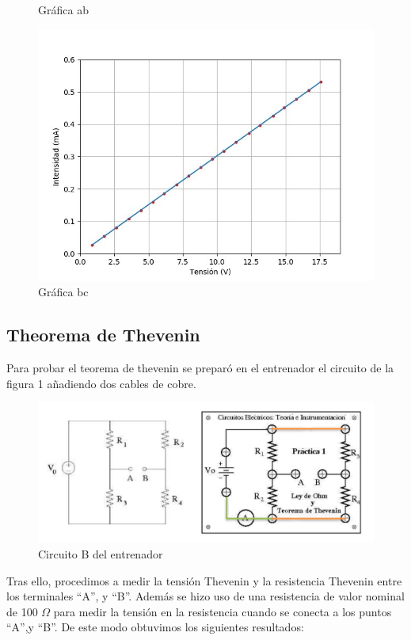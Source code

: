 \documentclass[a4paper,11pt]{article}
\begin{document}
\begin{figure}[hbtp]
\caption{Gráfica ab}
\includegraphics[scale=0.5]{Imagenes/Grafica_bc.jpg}
\caption{Gráfica bc}
\end{figure}

\newpage
\subsection{Theorema de Thevenin}

Para probar el teorema de thevenin se preparó en el entrenador el circuito de la figura 1 añadiendo dos cables de cobre.

\begin{figure}[hbtp]
\centering
\includegraphics[scale=0.5]{Imagenes/Entrenador_B.png}
\caption{Circuito B del entrenador}
\end{figure}

Tras ello, procedimos a medir la tensión Thevenin y la resistencia Thevenin entre los terminales “A”, y “B”. Además se hizo uso de una resistencia de valor nominal de 100 $\Omega$ para medir la tensión en la resistencia cuando se conecta a los puntos “A”,y “B”. De este modo obtuvimos los siguientes resultados:\\
\end{document}
